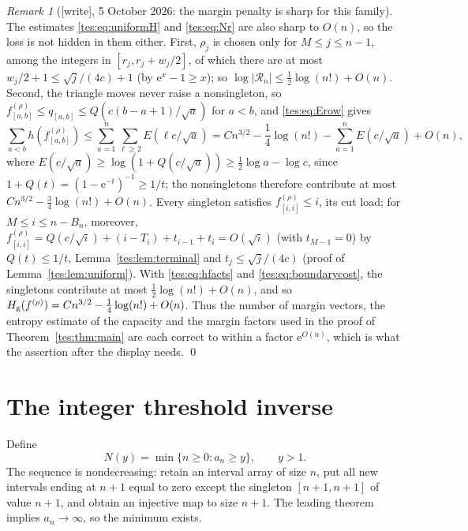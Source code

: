 \documentclass[11pt,a4paper]{article}
\theoremstyle{remark}\newtheorem{remark}[theorem]{Remark}
\newcommand{\ee}{\mathrm e}\newcommand{\dd}{\,\mathrm d}
\newcommand{\Hg}{H_{\rm g}}\newcommand{\floor}[1]{\left\lfloor#1\right\rfloor}
\numberwithin{equation}{section}
\begin{document}
\begin{remark}[{[write]}, 5 October 2026: the margin penalty is sharp for this family]
The estimates \eqref{tes:eq:uniformH} and \eqref{tes:eq:Nr} are also sharp
to $O(n)$, so the loss is not hidden in them either. First, $\rho_j$ is
chosen only for $M\le j\le n-1$, among the integers in
$[r_j,r_j+w_j/2]$, of which there are at most
$w_j/2+1\le\sqrt j/(4c)+1$ (by $\ee^x-1\ge x$); so
$\log|\mathcal R_n|\le\frac12\log(n!)+O(n)$. Second, the triangle moves
never raise a nonsingleton, so $f^{(\rho)}_{[a,b]}\le q_{[a,b]}\le
Q(c(b-a+1)/\sqrt a)$ for $a<b$, and \eqref{tes:eq:Erow} gives
\[
\sum_{a<b}h(f^{(\rho)}_{[a,b]})\le\sum_{a=1}^n\sum_{\ell\ge2}E(\ell c/\sqrt a)
=Cn^{3/2}-\frac14\log(n!)-\sum_{a=1}^nE(c/\sqrt a)+O(n),
\]
where $E(c/\sqrt a)\ge\log(1+Q(c/\sqrt a))\ge\frac12\log a-\log c$, since
$1+Q(t)=(1-\ee^{-t})^{-1}\ge1/t$; the nonsingletons therefore contribute at
most $Cn^{3/2}-\frac34\log(n!)+O(n)$. Every singleton satisfies
$f^{(\rho)}_{[i,i]}\le i$, its cut load; for $M\le i\le n-B_n$, moreover,
$f^{(\rho)}_{[i,i]}=Q(c/\sqrt i)+(i-T_i)+t_{i-1}+t_i=O(\sqrt i)$ (with
$t_{M-1}=0$) by $Q(t)\le1/t$, Lemma~\ref{tes:lem:terminal} and
$t_j\le\sqrt j/(4c)$ (proof of Lemma~\ref{tes:lem:uniform}). With
\eqref{tes:eq:hfacts} and \eqref{tes:eq:boundarycost}, the singletons
contribute at most $\frac12\log(n!)+O(n)$, and so
$\Hg(f^{(\rho)})=Cn^{3/2}-\frac14\log(n!)+O(n)$. Thus the number of margin
vectors, the entropy estimate of the capacity and the margin factors used in
the proof of Theorem~\ref{tes:thm:main} are each correct to within a factor
$\ee^{O(n)}$, which is what the assertion after the display needs.
\qed
\end{remark}

\section{The integer threshold inverse}\label{tes:sec:inverse}
Define
\begin{equation}\label{tes:eq:Ndef}
N(y)=\min\{n\ge0:a_n\ge y\},\qquad y>1.
\end{equation}
The sequence is nondecreasing: retain an interval array of size $n$, put all new intervals ending at $n+1$ equal to zero except the singleton $[n+1,n+1]$ of value $n+1$, and obtain an injective map to size $n+1$. The leading theorem implies $a_n\to\infty$, so the minimum exists.
\end{document}
